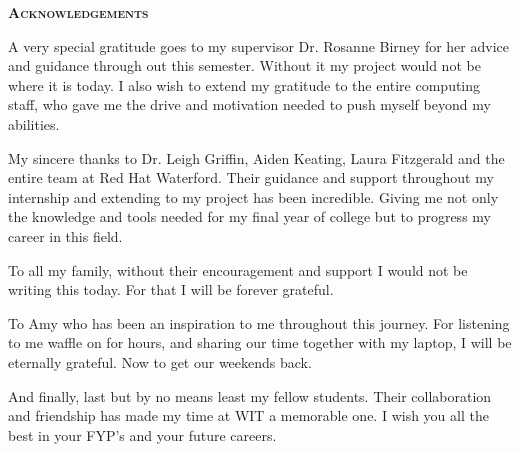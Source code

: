 \begin{center}
{\scshape\LARGE \textbf{Acknowledgements}\par}
\end{center}
\thispagestyle{empty}
\vspace{1cm}
A very special gratitude goes to my supervisor Dr. Rosanne Birney for her advice and guidance through out this semester. Without it my project would not be where it is today. I also wish to extend my gratitude to the entire computing staff, who gave me the drive and motivation needed to push myself beyond my abilities.

My sincere thanks to Dr. Leigh Griffin, Aiden Keating, Laura Fitzgerald and the entire team at Red Hat Waterford. Their guidance and support throughout my internship and extending to my project has been incredible. Giving me not only the knowledge and tools needed for my final year of college but to progress my career in this field.

To all my family, without their encouragement and support I would not be writing this today. For that I will be forever grateful.

To Amy who has been an inspiration to me throughout this journey. For listening to me waffle on for hours, and sharing our time together with my laptop, I will be eternally grateful. Now to get our weekends back.

And finally, last but by no means least my fellow students. Their collaboration and friendship has made my time at WIT a memorable one. I wish you all the best in your FYP's and your future careers. 
